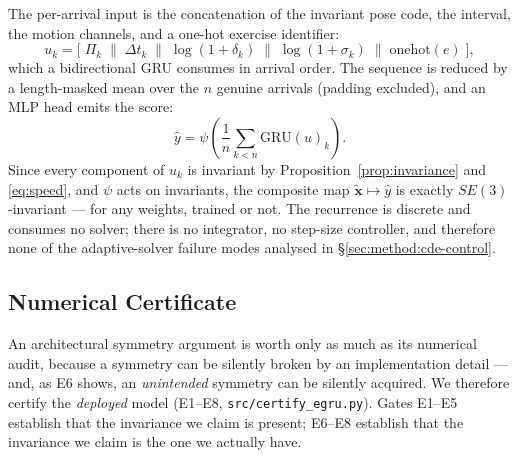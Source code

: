 The per-arrival input is the concatenation of the invariant pose code, the interval, the motion
channels, and a one-hot exercise identifier:
%
\begin{equation}
\label{eq:input}
u_k=\Big[\;\Pi_k \;\big\|\; \Delta t_k \;\big\|\; \log(1+\delta_k) \;\big\|\; \log(1+\sigma_k)
\;\big\|\; \mathrm{onehot}(e)\;\Big],
\end{equation}
%
which a bidirectional GRU consumes in arrival order. The sequence is reduced by a length-masked mean
over the $n$ genuine arrivals (padding excluded), and an MLP head emits the score:
%
\begin{equation}
\label{eq:head}
\hat y=\psi\!\left(\frac{1}{n}\sum_{k<n}\mathrm{GRU}(u)_k\right).
\end{equation}
%
Since every component of $u_k$ is invariant by Proposition~\ref{prop:invariance} and
\eqref{eq:speed}, and $\psi$ acts on invariants, the composite map
$\tilde{\bm{x}}\mapsto\hat y$ is exactly $SE(3)$-invariant --- for any weights, trained or not. The
recurrence is discrete and consumes no solver; there is no integrator, no step-size controller, and
therefore none of the adaptive-solver failure modes analysed in \S\ref{sec:method:cde-control}.

\subsection{Numerical Certificate}
\label{sec:method:cert}

An architectural symmetry argument is worth only as much as its numerical audit, because a symmetry
can be silently broken by an implementation detail --- and, as E6 shows, an \emph{unintended} symmetry
can be silently acquired. We therefore certify the \emph{deployed} model
(E1--E8, \texttt{src/certify\_egru.py}). Gates E1--E5 establish that the invariance we claim is
present; E6--E8 establish that the invariance we claim is the one we actually have.

